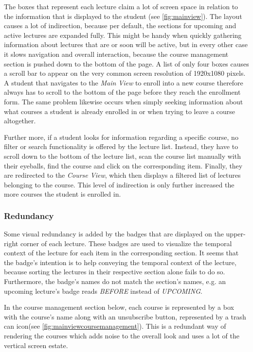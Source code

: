 The boxes that represent each lecture claim a lot of screen space in relation to the information that is displayed to the student (see \autoref{fig:mainview}). The layout causes a lot of indirection, because per default, the sections for upcoming and active lectures are expanded fully. This might be handy when quickly gathering information about lectures that are or soon will be active, but in every other case it slows navigation and overall interaction, because the course management section is pushed down to the bottom of the page.
A list of only four boxes causes a scroll bar to appear on the very common screen resolution of 1920x1080 pixels. A student that navigates to the \emph{Main View} to enroll into a new course therefore always has to scroll to the bottom of the page before they reach the enrollment form. The same problem likewise occurs when simply seeking information about what courses a student is already enrolled in or when trying to leave a course altogether. 

Further more, if a student looks for information regarding a specific course, no filter or search functionality is offered by the lecture list. Instead, they have to scroll down to the bottom of the lecture list, scan the course list manually with their eyeballs, find the course and click on the corresponding item. Finally, they are redirected to the \emph{Course View}, which then displays a filtered list of lectures belonging to the course. This level of indirection is only further increased the more courses the student is enrolled in. 


\subsubsection{Redundancy}

Some visual redundancy is added by the badges that are displayed on the upper-right corner of each lecture. These badges are used to visualize the temporal context of the lecture for each item in the corresponding section. It seems that the badge's intention is to help conveying the temporal context of the lecture, because sorting the lectures in their respective section alone fails to do so. Furthermore, the badge's names do not match the section's names, e.g. an upcoming lecture's badge reads \emph{BEFORE} instead of \emph{UPCOMING}. 

In the course management section below, each course is represented by a box with the course's name along with an unsubscribe button, represented by a trash can icon(see  \autoref{fig:mainviewcoursemanagement}).
This is a redundant way of rendering the courses which adds noise to the overall look
and uses a lot of the vertical screen estate.

